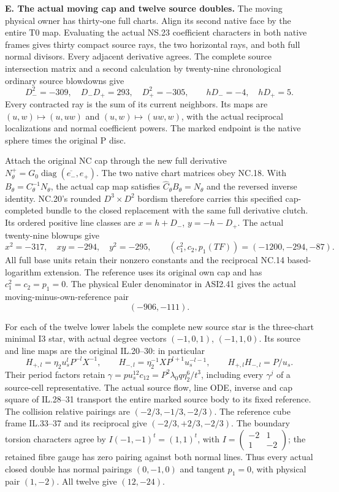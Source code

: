 \medskip\noindent\textbf{E. The actual moving cap and twelve source doubles.}
The moving physical owner has thirty-one full charts.  Align its second
native face by the entire T0 map.  Evaluating the actual NS.23 coefficient
characters in both native frames gives thirty compact source rays, the
two horizontal rays, and both full normal divisors.  Every adjacent
derivative agrees.  The complete source intersection matrix and a second
calculation by twenty-nine chronological ordinary source blowdowns give
\[
D_-^2=-309,\quad D_-D_+=293,\quad D_+^2=-305,
\qquad hD_-=-4,\quad hD_+=5.
\]
Every contracted ray is the sum of its current neighbors.  Its maps are
\((u,w)\mapsto(u,uw)\) and \((u,w)\mapsto(uw,w)\), with the actual
reciprocal localizations and normal coefficient powers.  The marked
endpoint is the native sphere times the original P disc.

Attach the original NC cap through the new full derivative
\(N^+_\theta=G_0\operatorname{diag}(\overline{e_-},e_+)\).
The two native chart matrices obey NC.18.  With
\(B_\theta=C_\theta^{-1}N_\theta\), the actual cap map satisfies
\(\widehat C_\theta B_\theta=N_\theta\) and the reversed inverse
identity.  NC.20's rounded \(D^3\times D^2\) bordism therefore carries
this specified cap-completed bundle to the closed replacement with the
same full derivative clutch.  Its ordered positive line classes are
\(x=h+D_-\), \(y=-h-D_+\).  The actual twenty-nine blowups give
\[
x^2=-317,\quad xy=-294,\quad y^2=-295,
\qquad(c_1^2,c_2,p_1(TF))=(-1200,-294,-87).
\]
All full base units retain their nonzero constants and the reciprocal
NC.14 based-logarithm extension.  The reference uses its original own
cap and has \(c_1^2=c_2=p_1=0\).  The physical Euler denominator in
ASI2.41 gives the actual moving-minus-own-reference pair
\[
                              (-906,-111).
\]

For each of the twelve lower labels the complete new source star is the
three-chart minimal I3 star, with actual degree vectors
\((-1,0,1)\), \((-1,1,0)\).  Its source and line maps are the original
IL.20--30: in particular
\[
H_{+,l}=\eta_2u_s^lP^{-l}X^{-1},\qquad
H_{-,l}=\eta_2^{-1}XP^{l+1}u_s^{-l-1},\qquad
H_{+,l}H_{-,l}=P/u_s.
\]
Their period factors retain
\(\gamma=pu_s^{12}c_{12}=P^2\lambda_0q\eta_2^6/t^3\), including every
\(\gamma^j\) of a source-cell representative.  The actual source flow,
line ODE, inverse and cap square of IL.28--31 transport the entire marked
source body to its fixed reference.  The collision relative pairings are
\((-2/3,-1/3,-2/3)\).  The reference cube frame IL.33--37 and its
reciprocal give \((-2/3,+2/3,-2/3)\).  The boundary torsion characters
agree by \(I(-1,-1)^t=(1,1)^t\), with
\(I=\left(\begin{smallmatrix}-2&1\\1&-2\end{smallmatrix}\right)\);
the retained fibre gauge has zero pairing
against both normal lines.  Thus every actual closed double has normal
pairings \((0,-1,0)\) and tangent \(p_1=0\), with physical pair
\((1,-2)\).  All twelve give \((12,-24)\).

